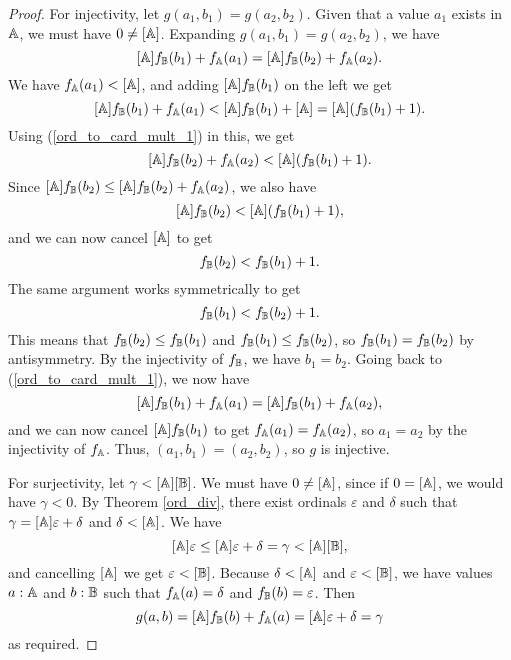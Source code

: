 \documentclass[../../math.tex]{subfiles}
\begin{document}
\begin{proof}
    For injectivity, let $g(a_1, b_1) = g(a_2, b_2)$.  Given that a value $a_1$
    exists in $\mathbb{A}$, we must have $0 \neq [\mathbb{A}]$.  Expanding $g(a_1, b_1) = g(a_2,
    b_2)$, we have
    \begin{equation} \label{ord_to_card_mult_1}
        [\mathbb{A}] f_{\mathbb{B}}(b_1) + f_{\mathbb{A}}(a_1) = [\mathbb{A}] f_{\mathbb{B}}(b_2) + f_{\mathbb{A}}(a_2).
    \end{equation}
    We have $f_{\mathbb{A}}(a_1) < [\mathbb{A}]$, and adding $[\mathbb{A}] f_{\mathbb{B}}(b_1)$ on the left we get
    \begin{equation} \label{ord_to_card_mult_2}
        [\mathbb{A}] f_{\mathbb{B}}(b_1) + f_{\mathbb{A}}(a_1) < [\mathbb{A}] f_{\mathbb{B}}(b_1) + [\mathbb{A}] = [\mathbb{A}] (f_{\mathbb{B}}(b_1) +
        1).
    \end{equation}
    Using (\ref{ord_to_card_mult_1}) in this, we get
    \begin{equation} \label{ord_to_card_mult_3}
        [\mathbb{A}] f_{\mathbb{B}}(b_2) + f_{\mathbb{A}}(a_2) < [\mathbb{A}] (f_{\mathbb{B}}(b_1) + 1).
    \end{equation}
    Since $[\mathbb{A}] f_{\mathbb{B}}(b_2) \leq [\mathbb{A}] f_{\mathbb{B}}(b_2) + f_{\mathbb{A}}(a_2)$, we also have
    \begin{equation} \label{ord_to_card_mult_4}
        [\mathbb{A}] f_{\mathbb{B}}(b_2) < [\mathbb{A}] (f_{\mathbb{B}}(b_1) + 1),
    \end{equation}
    and we can now cancel $[\mathbb{A}]$ to get
    \begin{equation} \label{ord_to_card_mult_5}
        f_{\mathbb{B}}(b_2) < f_{\mathbb{B}}(b_1) + 1.
    \end{equation}
    The same argument works symmetrically to get
    \begin{equation} \label{ord_to_card_mult_6}
        f_{\mathbb{B}}(b_1) < f_{\mathbb{B}}(b_2) + 1.
    \end{equation}
    This means that $f_{\mathbb{B}}(b_2) \leq f_{\mathbb{B}}(b_1)$ and $f_{\mathbb{B}}(b_1) \leq f_{\mathbb{B}}(b_2)$,
    so $f_{\mathbb{B}}(b_1) = f_{\mathbb{B}}(b_2)$ by antisymmetry.  By the injectivity of $f_{\mathbb{B}}$,
    we have $b_1 = b_2$.  Going back to (\ref{ord_to_card_mult_1}), we now have
    \begin{equation} \label{ord_to_card_mult_7}
        [\mathbb{A}] f_{\mathbb{B}}(b_1) + f_{\mathbb{A}}(a_1) = [\mathbb{A}] f_{\mathbb{B}}(b_1) + f_{\mathbb{A}}(a_2),
    \end{equation}
    and we can now cancel $[\mathbb{A}] f_{\mathbb{B}}(b_1)$ to get $f_{\mathbb{A}}(a_1) = f_{\mathbb{A}}(a_2)$, so
    $a_1 = a_2$ by the injectivity of $f_{\mathbb{A}}$.  Thus, $(a_1, b_1) = (a_2, b_2)$,
    so $g$ is injective.

    For surjectivity, let $\gamma < [\mathbb{A}][\mathbb{B}]$.  We must have $0 \neq [\mathbb{A}]$,
    since if $0 = [\mathbb{A}]$, we would have $\gamma < 0$.  By Theorem \ref{ord_div},
    there exist ordinals $\varepsilon$ and $\delta$ such that $\gamma = [\mathbb{A}]
    \varepsilon + \delta$ and $\delta < [\mathbb{A}]$.  We have
    \[
        [\mathbb{A}] \varepsilon \leq [\mathbb{A}] \varepsilon + \delta = \gamma < [\mathbb{A}] [\mathbb{B}],
    \]
    and cancelling $[\mathbb{A}]$ we get $\varepsilon < [\mathbb{B}]$.  Because $\delta < [\mathbb{A}]$
    and $\varepsilon < [\mathbb{B}]$, we have values $a : \mathbb{A}$ and $b : \mathbb{B}$ such that
    $f_{\mathbb{A}}(a) = \delta$ and $f_{\mathbb{B}}(b) = \varepsilon$.  Then
    \[
        g(a, b) = [\mathbb{A}] f_{\mathbb{B}}(b) + f_{\mathbb{A}}(a) = [\mathbb{A}] \varepsilon + \delta = \gamma
    \]
    as required.
\end{proof}
\end{document}
